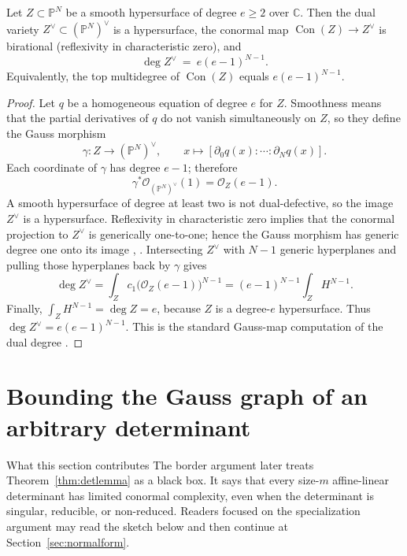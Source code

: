 \documentclass[acmsmall,screen,nonacm]{acmart}
\theoremstyle{definition}
\theoremstyle{remark}
\DeclareMathOperator{\Con}{Con}
\newcommand{\PP}{\mathbb{P}}
\newcommand{\CC}{\mathbb{C}}
\newcommand{\OO}{\mathcal{O}}
\begin{document}
\begin{lemma}\label{lem:dualdeg}
Let $Z\subset\PP^{N}$ be a smooth hypersurface of degree $e\ge2$ over
$\CC$.  Then the dual variety $Z^\vee\subset(\PP^N)^\vee$ is a
hypersurface, the conormal map $\Con(Z)\to Z^\vee$ is birational
(reflexivity in characteristic zero), and
\[
  \deg Z^\vee\ =\ e(e-1)^{N-1}.
\]
Equivalently, the top multidegree of $\Con(Z)$ equals
$e(e-1)^{N-1}$.
\end{lemma}

\begin{proof}
Let $q$ be a homogeneous equation of degree $e$ for $Z$.  Smoothness means
that the partial derivatives of $q$ do not vanish simultaneously on $Z$, so
they define the Gauss morphism
\[
  \gamma:Z\longrightarrow(\PP^N)^\vee,
  \qquad x\longmapsto
  [\partial_0q(x):\cdots:\partial_Nq(x)].
\]
Each coordinate of $\gamma$ has degree $e-1$; therefore
\[
  \gamma^*\OO_{(\PP^N)^\vee}(1)=\OO_Z(e-1).
\]
A smooth hypersurface of degree at least two is not dual-defective, so the
image $Z^\vee$ is a hypersurface.  Reflexivity in characteristic zero implies
that the conormal projection to $Z^\vee$ is generically one-to-one; hence the
Gauss morphism has generic degree one onto its image
\cite[Ch.~1]{GKZ94}, \cite[\S7]{Tevelev05}.  Intersecting $Z^\vee$ with
$N-1$ generic hyperplanes and pulling those hyperplanes back by $\gamma$
gives
\[
  \deg Z^\vee
  =\int_Z c_1\big(\OO_Z(e-1)\big)^{N-1}
  =(e-1)^{N-1}\int_Z H^{N-1}.
\]
Finally, $\int_ZH^{N-1}=\deg Z=e$, because $Z$ is a degree-$e$
hypersurface.  Thus $\deg Z^\vee=e(e-1)^{N-1}$.  This is the standard
Gauss-map computation of the dual degree \cite{Piene78}.
\end{proof}

\section{Bounding the Gauss graph of an arbitrary determinant}\label{sec:detlemma}

\begin{readerbox}{What this section contributes}
The border argument later treats Theorem~\ref{thm:detlemma} as a black box.  It says that every size-$m$ affine-linear determinant has limited conormal complexity, even when the determinant is singular, reducible, or non-reduced.  Readers focused on the specialization argument may read the sketch below and then continue at Section~\ref{sec:normalform}.
\end{readerbox}
\end{document}
